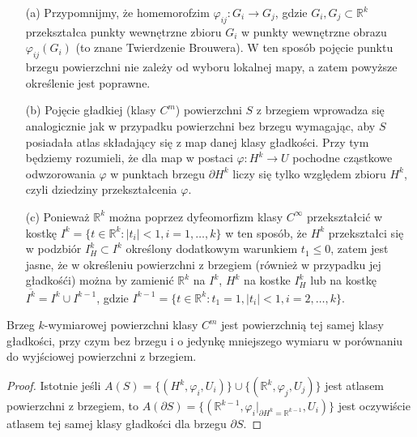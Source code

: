 \documentclass[leqno]{article}
\begin{document}
\begin{justify}
\begin{uwaga}
    \begin{itemize}
        \item [(a)] Przypomnijmy, że homemorofzim $\varphi_{ij} : G_i \to G_j$, gdzie $G_i, G_j \subset \mathbb{R}^k$ przekształca 
            punkty wewnętrzne zbioru $G_i$ w punkty wewnętrzne obrazu $\varphi_{ij}(G_i)$ (to znane Twierdzenie Brouwera). 
            W ten sposób pojęcie punktu brzegu powierzchni nie zależy od wyboru lokalnej mapy, a zatem powyższe określenie jest poprawne. 
        \item [(b)]
            Pojęcie gładkiej (klasy $C^m$) powierzchni $S$ z brzegiem wprowadza się analogicznie jak w przypadku powierzchni bez brzegu wymagając, aby $S$
            posiadała atlas składający się z map danej klasy gładkości. Przy tym będziemy rozumieli, że dla map w postaci $\varphi : H^k \to U$
            pochodne cząstkowe odwzorowania $\varphi$ w punktach brzegu $\partial H^k$ liczy się tylko względem zbioru $H^k$, czyli dziedziny przekształcenia $\varphi$. 
        \item [(c)]
            Ponieważ $\mathbb{R}^k$ można poprzez dyfeomorfizm klasy  $C^\infty$ przekształcić w kostkę $I^k = \{t \in \mathbb{R}^k : |t_i| < 1, i =1 ,\ldots, k\}$ w ten sposób, że 
            $H^k$ przekształci się w podzbiór $I_{H}^k \subset I^k$ określony dodatkowym warunkiem $t_1 \leqslant 0$, zatem jest jasne, że 
            w określeniu powierzchni z brzegiem (również w przypadku jej gładkośći) można by zamienić $\mathbb{R}^k$ na $I^k$, $H^k$ na kostke $I^k_{H}$
            lub na kostkę $\overline{I^k} = I^k \cup I^{k-1}$, gdzie $I^{k-1} = \{t \in \mathbb{R}^k : t_1 = 1, |t_i| < 1, i = 2, \ldots, k\}$.
    \end{itemize}
\end{uwaga}

\begin{theorem}
{
    Brzeg $k$-wymiarowej powierzchni klasy $C^m$ jest powierzchnią tej samej klasy gładkości, przy czym bez brzegu i o jedynkę mniejszego wymiaru w porównaniu do wyjściowej powierzchni z brzegiem.
}
\end{theorem}

\begin{proof}
    Istotnie jeśli $A(S) = \{(H^k, \varphi_i, U_i)\} \cup \{(\mathbb{R}^k, \varphi_j, U_j)\}$ jest atlasem powierzchni z brzegiem, to $A(\partial S) = \{(\mathbb{R}^{k-1}, \varphi_i |_{\partial H^k = \mathbb{R}^{k-1}}, U_i)\}$
    jest oczywiście atlasem tej samej klasy gładkości dla brzegu $\partial S$.
\end{proof}


\end{justify}
\end{document}
